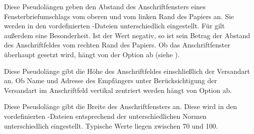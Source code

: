 \begin{Declaration}
\end{Declaration}
Diese Pseudolängen geben den Abstand des Anschriftfensters eines
Fensterbriefumschlags vom oberen und vom linken Rand des Papiers an.  Sie
werden in den vordefinierten
-Dateien
unterschiedlich eingestellt.  Für  gilt außerdem eine
Besonderheit. Ist der Wert negativ, so ist sein Betrag der Abstand des
Anschriftfeldes vom rechten Rand des Papiers. %
 Ob das Anschriftfenster überhaupt gesetzt wird, hängt von der Option
 ab (siehe
).%
\EndIndexGroup


\begin{Declaration}
\end{Declaration}
Diese Pseudolänge gibt die Höhe des Anschriftfeldes einschließlich der
Versandart an. Ob Name und Adresse des Empfängers unter Berücksichtigung der
Versandart im Anschriftfeld vertikal zentriert werden hängt von Option
 ab.%
\EndIndexGroup


\begin{Declaration}
\end{Declaration}
Diese Pseudolänge gibt die Breite des Anschriftfensters an. Diese wird in den
vordefinierten
-Dateien
entsprechend der unterschiedlichen Normen unterschiedlich
eingestellt. Typische Werte liegen zwischen 70 und 100.

